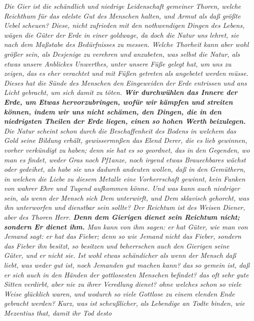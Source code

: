 \textit{Die Gier ist die schändlich und niedrige Leidenschaft gemeiner Thoren,
welche
Reichthum für das edelste Gut des Menschen halten, und Armut als daß größte
Uebel scheuen? Diese, nicht zufrieden mit den nothwendigen Dingen des Lebens,
wägen die Güter der Erde in einer goldwage, da doch die Natur uns lehret, sie
nach dem Maßstabe des Bedürfnisses zu messen. Welche Thorheit kann aber wohl
größer sein, als Desjenige zu verehren und anzubeten, was selbst die Natur, als
etwas unsere Anblickes Unwerthes, unter unsere Füße gelegt hat, um uns zu
zeigen, das es eher verachtet und mit Füßen getreten als angebetet werden müsse.
Dieses hat die Sünde des Menschen den Eingeweiden der Erde entrissen und ans
Licht gebracht, um sich damit zu töten. \label{ref:13_21_Kapitalisten_kritik}
\textbf{Wir durchwühlen das Innere der
Erde, um
Etwas hervorzubringen, wofür wir kämpfen und streiten können, indem wir uns
nicht schämen, den Dingen, die in den niedrigsten Theilen der Erde liegen, einen
so hohen Werth beizulegen.} Die Natur scheint schon durch die Beschaffenheit des
Bodens in welchem das Gold seine Bildung erhält, gewissermnßen das Elend Derer,
die es lieb gewinnen, vorher verkündigt zu haben; denn sie hat es so geordnet,
das in den Gegenden, wo man es findet, weder Gras noch Pf1anze, noch irgend
etwas Brauechbares wächst oder gedeihet, als habe sie uns dadurch andeuten
wollen, daß in den Gemüthern, in welchen die Liebe zu diesem Metalle eine
Vorherrschaft gewinnt, kein Funken von wahrer Ehre und Tugend aufkommen könne.
Und was kann auch niedriger sein, als wenn der Mensch sich Dem unterwirft, und
Dem sklavisch gehorcht, was ihn unterworfen und dienstbar sein sollte? Der
Reichtum ist des Weisen Diener, aber des Thoren Herr.
\label{ref:13_21_Kapitalisten_dienerschaft} \textbf{Denn dem Gierigen dienet
sein Reichtum nicht; sondern Er dienet ihm.} Man kann von ihm sagen: er hat
Güter, wie man von Jemand sagt: er hat das Fieber; denn so wie Jemand nicht das
Fieber, sondern das Fieber ihn besitzt, so besitzen und beherrschen auch den
Gierigen seine Güter, und er nicht sie. Ist wohl etwas schändicher als wenn der
Mensch daß liebt, was weder gut ist, noch Jemanden gut machen kann? das so
gemein ist, daß er sich auch in den Händen der gottlosesten Menschen befindet?
das oft sehr gute Sitten verdirbt, aber nie zu ihrer Veredlung dienet? ohne
welches schon so viele Weise glücklich waren, und wodurch so viele Gottlose zu
einem elenden Ende gebracht werden? Kurz, was ist scheußlicher, als Lebendige an
Todte binden, wie Mezentius that, damit ihr Tod desto
}
